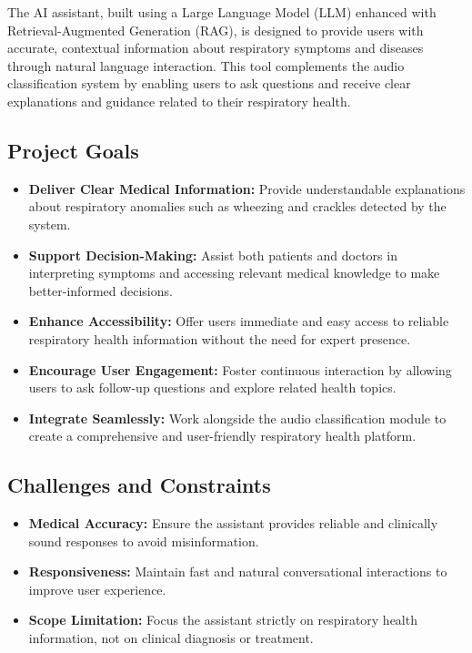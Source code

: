 \label{subsec:business-understanding}

The AI assistant, built using a Large Language Model (LLM) enhanced with Retrieval-Augmented Generation (RAG), is designed to provide users with accurate, contextual information about respiratory symptoms and diseases through natural language interaction. This tool complements the audio classification system by enabling users to ask questions and receive clear explanations and guidance related to their respiratory health.

\subsection*{Project Goals}
\begin{itemize}
    \item \textbf{Deliver Clear Medical Information:} Provide understandable explanations about respiratory anomalies such as wheezing and crackles detected by the system.
    
    \item \textbf{Support Decision-Making:} Assist both patients and doctors in interpreting symptoms and accessing relevant medical knowledge to make better-informed decisions.
    
    \item \textbf{Enhance Accessibility:} Offer users immediate and easy access to reliable respiratory health information without the need for expert presence.
    
    \item \textbf{Encourage User Engagement:} Foster continuous interaction by allowing users to ask follow-up questions and explore related health topics.
    
    \item \textbf{Integrate Seamlessly:} Work alongside the audio classification module to create a comprehensive and user-friendly respiratory health platform.
\end{itemize}

\subsection*{Challenges and Constraints}
\begin{itemize}
    \item \textbf{Medical Accuracy:} Ensure the assistant provides reliable and clinically sound responses to avoid misinformation.
    
    \item \textbf{Responsiveness:} Maintain fast and natural conversational interactions to improve user experience.
    
    \item \textbf{Scope Limitation:} Focus the assistant strictly on respiratory health information, not on clinical diagnosis or treatment.
\end{itemize}